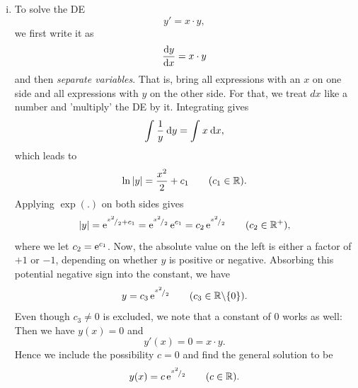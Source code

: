 \begin{example}
\begin{enumerate}[(i)]
	\item To solve the DE
	\[ y' = x \cdot y, \]
	we first write it as
	\[ \displaystyle{\frac{\mathrm{d}y}{\mathrm{d}x}} = x \cdot y \]
	and then \emph{separate variables}. That is, bring all expressions with an $x$ on one side and all expressions with $y$ on the other side. For that, we treat $dx$ like a number and 'multiply' the DE by it. Integrating gives
	\begin{equation}
	\label{eq:first_sop}
	 \int_{}^{} \frac{1}{y} \: \mathrm{d} y = \int_{}^{} x \: \mathrm{d} x,
	\end{equation}
	which leads to
	\[ \ln\left| y \right| = \frac{x^2}{2} + c_1 \qquad (c_1\in\mathbb{R}). \]
	Applying $\exp(.)$ on both sides gives
	\[ \left| y \right| = \mathrm{e}^{{}^{x^2}\!/_{2}+c_1} = \mathrm{e}^{{}^{x^2}\!/_{2}}\,\mathrm{e}^{c_1} = c_2\, \mathrm{e}^{{}^{x^2}\!/_{2}} \qquad (c_2\in\mathbb{R}^+),\]
	where we let $c_2=\mathrm{e}^{c_1}$. Now, the absolute value on the left is either a factor of $+1$ or $-1$, depending on whether $y$ is positive or negative. Absorbing this potential negative sign into the constant, we have
	\[ y=c_3\,\mathrm{e}^{{}^{x^2}\!/_{2}} \qquad (c_3\in\mathbb{R}\backslash\{0\}). \]
	Even though $c_3 \not= 0$ is excluded, we note that a constant of $0$ works as well: Then we have $y(x)=0$ and 
	\[ y'(x) = 0 = x \cdot y. \]
	Hence we include the possibility $c=0$ and find the general solution to be
	\[ y(x) = c\,\mathrm{e}^{{}^{x^2}\!/_{2}} \qquad (c\in\mathbb{R}). \]
	

\end{enumerate}
\end{example}
